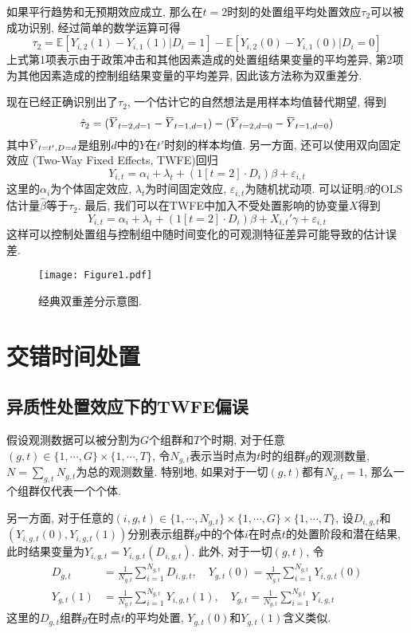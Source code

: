 \documentclass[cn,blue,14pt,screen,bibstyle=gb7714-2015]{elegantnote}
\newcommand{\E}{\mathbb{E}}
\newcommand{\overbar}[1]{\mkern 1.5mu\overline{\mkern-1.5mu#1\mkern-1.5mu}\mkern 1.5mu}
\begin{document}
如果平行趋势和无预期效应成立, 那么在$t=2$时刻的处置组平均处置效应$\tau_2$可以被成功识别, 经过简单的数学运算可得
$$\tau_2=\E[Y_{i,2}(1)-Y_{i,1}(1)|D_i=1]-\E[Y_{i,2}(0)-Y_{i,1}(0)|D_i=0]$$
上式第1项表示由于政策冲击和其他因素造成的处置组结果变量的平均差异, 第2项为其他因素造成的控制组结果变量的平均差异, 因此该方法称为双重差分.

现在已经正确识别出了$\tau_2$, 一个估计它的自然想法是用样本均值替代期望, 得到
$$\hat{\tau}_2=(\overbar{Y}_{t=2,d=1}-\overbar{Y}_{t=1,d=1})-(\overbar{Y}_{t=2,d=0}-\overbar{Y}_{t=1,d=0})$$
其中$\overbar{Y}_{t=t',D=d}$是组别$d$中的$Y$在$t'$时刻的样本均值. 另一方面, 还可以使用双向固定效应 (Two-Way Fixed Effects, TWFE)回归
$$Y_{i,t}=\alpha_i+\lambda_t+(1[t=2]\cdot D_i)\beta+\varepsilon_{i,t}$$
这里的$\alpha_i$为个体固定效应, $\lambda_t$为时间固定效应, $\varepsilon_{i,t}$为随机扰动项. 可以证明$\beta$的OLS估计量$\hat{\beta}$等于$\hat{\tau}_2$. 最后, 我们可以在TWFE中加入不受处置影响的协变量$X$得到
$$Y_{i,t}=\alpha_i+\lambda_t+(1[t=2]\cdot D_i)\beta+{X}_{i,t}'\gamma+\varepsilon_{i,t}$$
这样可以控制处置组与控制组中随时间变化的可观测特征差异可能导致的估计误差.

\begin{figure}
  \centering
  \texttt{[image: Figure1.pdf]}
  \caption{经典双重差分示意图.}
\end{figure}
\newpage
\section{交错时间处置}
\subsection{异质性处置效应下的TWFE偏误}
假设观测数据可以被分割为$G$个组群和$T$个时期, 对于任意$(g,t)\in \{1,\cdots,G\}\times\{1,\cdots,T\}$, 令$N_{g,t}$表示当时点为$t$时的组群$g$的观测数量, $N=\sum_{g,t}N_{g,t}$为总的观测数量. 特别地, 如果对于一切$(g,t)$都有$N_{g,t}=1$, 那么一个组群仅代表一个个体.

另一方面, 对于任意的$(i,g,t)\in\{1,\cdots,N_{g,t}\}\times\{1,\cdots,G\}\times\{1,\cdots,T\}$, 设$D_{i,g,t}$和$(Y_{i,g,t}(0),Y_{i,g,t}(1))$分别表示组群$g$中的个体$i$在时点$t$的处置阶段和潜在结果, 此时结果变量为$Y_{i,g,t}=Y_{i,g,t}(D_{i,g,t})$. 此外, 对于一切$(g,t)$, 令
\begin{align*}
D_{g,t}&=\frac{1}{N_{g,t}}\sum_{i=1}^{N_{g,t}}D_{i,g,t},\quad Y_{g,t}(0)=\frac{1}{N_{g,t}}\sum_{i=1}^{N_{g,t}}Y_{i,g,t}(0) \\
Y_{g,t}(1)&=\frac{1}{N_{g,t}}\sum_{i=1}^{N_{g,t}}Y_{i,g,t}(1),\quad Y_{g,t}=\frac{1}{N_{g,t}}\sum_{i=1}^{N_{g,t}}Y_{i,g,t}
\end{align*}
这里的$D_{g,t}$组群$g$在时点$t$的平均处置, $Y_{g,t}(0)$和$Y_{g,t}(1)$含义类似.
\end{document}
